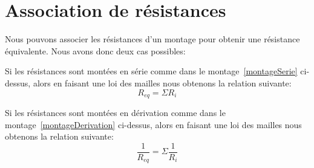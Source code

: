 \documentclass[12pt,a4paper,openany]{book}
\begin{document}
\section{Association de résistances}

Nous pouvons associer les résistances d'un montage pour obtenir une résistance équivalente. Nous avons donc deux cas possibles:
\begin{figure}[!h]
\begin{center}
\hfill
{}
\end{center}
\caption{}
\end{figure}


Si les résistances sont montées en série comme dans le montage~\ref{montageSerie} ci-dessus, alors en faisant une loi des mailles nous obtenons la relation suivante:
\begin{equation}
R_{eq} = \Sigma R_{i}
\end{equation}

Si les résistances sont montées en dérivation comme dans le montage~\ref{montageDerivation} ci-dessus, alors en faisant une loi des mailles nous obtenons la relation suivante:
\begin{equation}
\frac{1}{R_{eq}} = \Sigma\frac{1}{R_{i}}
\end{equation}
\end{document}

